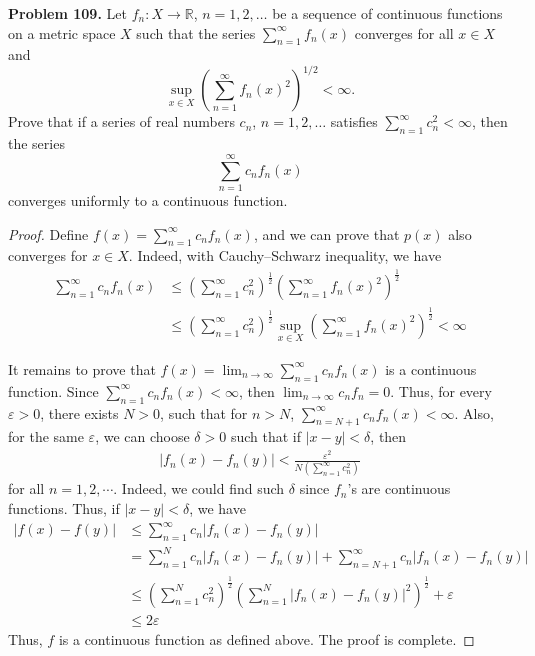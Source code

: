 \documentclass[12pt,leqno]{amsart}
\theoremstyle{definition}
\numberwithin{equation}{subsection}
\begin{document}
\noindent
{\bf Problem 109.}
Let $f_n:X\to\mathbb{R}$, $n=1,2,\ldots$ be a sequence of continuous functions on a metric space $X$ such that the series $\sum_{n=1}^\infty f_n(x)$ converges for all $x\in X$ and
$$
\sup_{x\in X}\left(\sum_{n=1}^\infty f_n(x)^2\right)^{1/2}<\infty.
$$
Prove that if a series of real numbers $c_n$, $n=1,2,\ldots$ satisfies $\sum_{n=1}^\infty c_n^2<\infty$, then the series
$$
\sum_{n=1}^\infty c_nf_n(x)
$$
converges uniformly to a continuous function.
\begin{proof}
Define $f(x) = \sum_{n=1}^\infty c_n f_n(x)$, and we can prove that $p(x)$ also converges for $x\in X$. Indeed, with Cauchy–Schwarz inequality, we have
\begin{align*}
    \sum_{n=1}^\infty c_nf_n(x) & \leq \left(\sum_{n=1}^\infty c_n^2\right)^{\frac{1}{2}} \left(\sum_{n=1}^\infty f_n(x)^2\right)^{\frac{1}{2}} \\
    & \leq \left(\sum_{n=1}^\infty c_n^2\right)^{\frac{1}{2}} \sup_{x\in X} \left(\sum_{n=1}^\infty f_n(x)^2\right)^{\frac{1}{2}} < \infty
\end{align*}

It remains to prove that $f(x) = \lim_{n\to\infty}\sum_{n=1}^\infty c_n f_n(x)$ is a continuous function. Since $\sum_{n=1}^\infty c_nf_n(x) < \infty$, then $\lim_{n\to\infty} c_n f_n = 0$. Thus, for every $\varepsilon > 0$, there exists $N > 0$, such that for $n > N$, $\sum_{n=N+1}^\infty c_nf_n(x) < \infty$. Also, for the same $\varepsilon$, we can choose $\delta > 0$ such that if $|x - y| < \delta$, then 
\begin{align*}
    \left|f_n(x) - f_n(y)\right| < \frac{\varepsilon^2}{N \left(\sum_{n=1}^\infty c_n^2\right)}
\end{align*}
for all $n = 1,2,\cdots$. Indeed, we could find such $\delta$ since $f_n$'s are continuous functions. Thus, if $|x - y| < \delta$, we have 
\begin{align*}
    \left|f(x) - f(y)\right| & \leq \sum_{n=1}^\infty c_n \left|f_n(x) - f_n(y)\right|\\
    & = \sum_{n=1}^N c_n \left|f_n(x) - f_n(y)\right| + \sum_{n=N+1}^\infty c_n \left|f_n(x) - f_n(y)\right|\\
    & \leq \left(\sum_{n=1}^N c_n^2\right)^{\frac{1}{2}} \left(\sum_{n=1}^N \left|f_n(x) - f_n(y)\right|^2\right)^{\frac{1}{2}} + \varepsilon \\
    & \leq 2 \varepsilon 
\end{align*}
Thus, $f$ is a continuous function as defined above. The proof is complete.
\end{proof}
\end{document}
